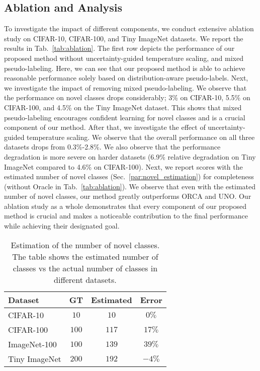 \documentclass[runningheads]{eccv2022submission}
\begin{document}
\subsection{Ablation and Analysis}
\label{sec:ablation_analysis}
To investigate the impact of different components, we conduct extensive ablation study on CIFAR-10, CIFAR-100, and Tiny ImageNet datasets. We report the results in Tab.~\ref{tab:ablation}. The first row depicts the performance of our proposed method without uncertainty-guided temperature scaling, and mixed pseudo-labeling. Here, we can see that our proposed method is able to achieve reasonable performance solely based on distribution-aware pseudo-labels. Next, we investigate the impact of removing mixed pseudo-labeling. We observe that the performance on novel classes drops considerably; 3\% on CIFAR-10, 5.5\% on CIFAR-100, and 4.5\% on the Tiny ImageNet dataset. This shows that mixed pseudo-labeling encourages confident learning for novel classes and is a crucial component of our method. After that, we investigate the effect of uncertainty-guided temperature scaling. We observe that the overall performance on all three datasets drops from 0.3\%-2.8\%. We also observe that the performance degradation is more severe on harder datasets (6.9\% relative degradation on Tiny ImageNet compared to 4.6\% on CIFAR-100). Next, we report scores with the estimated number of novel classes (Sec.~\ref{par:novel_estimation}) for completeness (without Oracle in Tab.~\ref{tab:ablation}). We observe that even with the estimated number of novel classes, our method greatly outperforms ORCA and UNO. Our ablation study as a whole demonstrates that every component of our proposed method is crucial and makes a noticeable contribution to the final performance while achieving their designated goal.   



\begin{table}
\caption{Estimation of the number of novel classes. The table shows the estimated number of classes vs the actual number of classes in different datasets.}
\begin{center}
\small
\begin{tabular}{l@{\hskip5pt}c@{\hskip5pt}|@{\hskip5pt}c@{\hskip5pt}|@{\hskip5pt}c}
\hline

\textbf{Dataset}  & \textbf{GT} & \textbf{Estimated} & \textbf{Error}\\




\hline
CIFAR-10 & $10$ & $10$ & $0\%$\\
CIFAR-100 & $100$ & $117$ & $17\%$\\
ImageNet-100 & $100$ & $139$ & $39\%$\\
Tiny ImageNet & $200$ & $192$ & $-4\%$\\
\hline 



\end{tabular}
\end{center}
\label{tab:estimation}
\vspace{-6mm}
\end{table}
\end{document}

